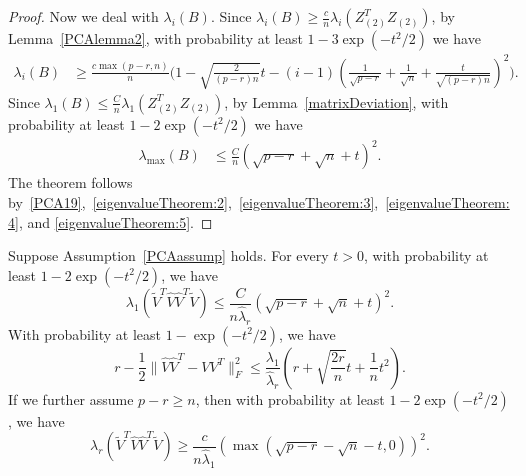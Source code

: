 \begin{proof}
    Now we deal with $\lambda_{i}(B)$. Since $\lambda_i(B)\geq \frac{c}{n} \lambda_i(Z_{(2)}^T Z_{(2)})$, by Lemma~\ref{PCAlemma2}, with probability at least $1-3\exp(-t^2/2)$ we have
\begin{equation}\label{eigenvalueTheorem:4}
    \begin{split}
        \lambda_{i}(B)
        &\geq
        \frac{c\max(p-r,n)}{n} \Big( 1-\sqrt{\frac{2}{(p-r)n}}t-(i-1)(\frac{1}{\sqrt{p-r}}+\frac{1}{\sqrt{n}}+\frac{t}{\sqrt{(p-r)n}})^2 \Big).
    \end{split}
\end{equation}
    Since $\lambda_1(B)\leq \frac{C}{n}\lambda_1(Z_{(2)}^T Z_{(2)})$, by Lemma~\ref{matrixDeviation}, with probability at least $1-2\exp(-t^2/2)$ we have
\begin{equation}\label{eigenvalueTheorem:5}
    \begin{split}
        \lambda_{\max}(B)
        &\leq
        \frac{C}{n} (\sqrt{p-r}+\sqrt{n}+t)^2.
    \end{split}
\end{equation}
    The theorem follows by~\eqref{PCA19},~\eqref{eigenvalueTheorem:2},~\eqref{eigenvalueTheorem:3},~\eqref{eigenvalueTheorem:4}, and \eqref{eigenvalueTheorem:5}.
\end{proof}



\begin{theorem}\label{theoremEigenvectors}
    Suppose Assumption~\ref{PCAassump} holds.
    For every $t>0$, with probability at least $1-2\exp(-t^2/2)$, we have
    \begin{equation}\label{PCAINeedThis}
        \lambda_1 (\tilde{V}^T \hat{V}\hat{V}^T \tilde{V})
        \leq \frac{C}{n\hat{\lambda}_r}(\sqrt{p-r}+\sqrt{n}+t)^2.
    \end{equation}
    With probability at least $1-\exp(-t^2/2)$, we have
    \begin{equation}\label{PCAtheorem102}
        r-\frac{1}{2}\|\hat{V}\hat{V}^T-VV^T\|^2_F\leq 
        \frac{\lambda_1}{\hat{\lambda}_r}
        (r+\sqrt{\frac{2r}{n}}t+\frac{1}{n}t^2).
    \end{equation}
If we further assume $p-r\geq n$, then with probability at least $1-2\exp(-t^2/2)$, we have
    \begin{equation}\label{PCAtheorem101}
    \lambda_r (\tilde{V}^T\hat{V}\hat{V}^T \tilde{V})\geq 
        \frac{c}{n\hat{\lambda}_1}(\max(\sqrt{p-r}-\sqrt{n}-t,0))^2.
    \end{equation}

\end{theorem}


